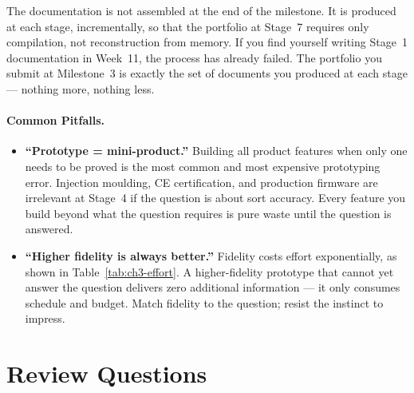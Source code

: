 The documentation is not assembled at the end of the milestone.
It is produced at each stage, incrementally, so that the portfolio at
Stage~7 requires only compilation, not reconstruction from memory.
If you find yourself writing Stage~1 documentation in Week~11, the
process has already failed.
The portfolio you submit at Milestone~3 is exactly the set of documents
you produced at each stage --- nothing more, nothing less.

\paragraph{Common Pitfalls.}
\begin{itemize}
  \item \textbf{``Prototype = mini-product.''}
    Building all product features when only one needs to be proved is the
    most common and most expensive prototyping error.
    Injection moulding, CE certification, and production firmware are
    irrelevant at Stage~4 if the question is about sort accuracy.
    Every feature you build beyond what the question requires is pure waste
    until the question is answered.

  \item \textbf{``Higher fidelity is always better.''}
    Fidelity costs effort exponentially, as shown in
    Table~\ref{tab:ch3-effort}.
    A higher-fidelity prototype that cannot yet answer the question delivers
    zero additional information --- it only consumes schedule and budget.
    Match fidelity to the question; resist the instinct to impress.
\end{itemize}

\section*{Review Questions}

